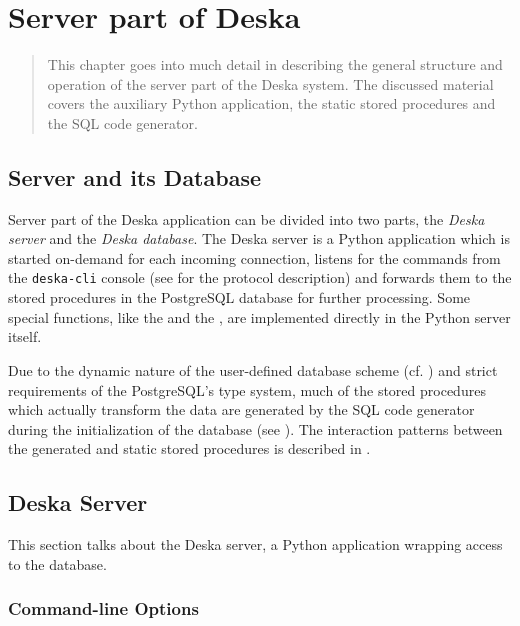 \documentclass[deska]{subfiles}
\begin{document}
\chapter{Server part of Deska}
\label{sec:deska-server}

\begin{abstract}
This chapter goes into much detail in describing the general structure and operation of the server part of the Deska
system.  The discussed material covers the auxiliary Python application, the static stored procedures and the SQL code
generator.
\end{abstract}

\section{Server and its Database}
Server part of the Deska application can be divided into two parts, the {\em Deska server} and the {\em Deska database}.
The Deska server is a Python application which is started on-demand for each incoming connection, listens for the
commands from the {\tt deska-cli} console (see  for the protocol description) and forwards
them to the stored procedures in the PostgreSQL database for further processing.  Some special functions, like the
 and the , are implemented directly in the Python server
itself.

Due to the dynamic nature of the user-defined database scheme (cf. ) and strict requirements
of the PostgreSQL's type system, much of the stored procedures which actually transform the data are generated by the
SQL code generator during the initialization of the database (see ).  The interaction patterns
between the generated and static stored procedures is described in .

\section{Deska Server}
\label{sec:server-py}

This section talks about the Deska server, a Python application wrapping access to the database.

\subsection{Command-line Options}
\end{document}
